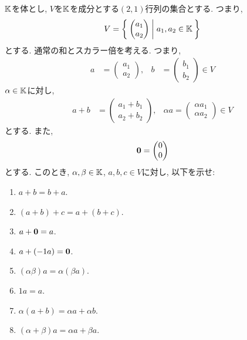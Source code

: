 \begin{quiz}
  $\mathbb{K}$を体とし, $V$を$\mathbb{K}$を成分とする$(2,1)$行列の集合とする.
  つまり,
  \begin{align*}
    V=\Set{\begin{pmatrix}a_1\\a_2\end{pmatrix}|a_1,a_2\in \mathbb{K}}
  \end{align*}
  とする. 通常の和とスカラー倍を考える.  つまり,
  \begin{align*}
    a&=\begin{pmatrix}a_1\\a_2\end{pmatrix}, & b&=\begin{pmatrix}b_1\\b_2\end{pmatrix} \in V
  \end{align*}
  $\alpha\in\mathbb{K}$に対し,
  \begin{align*}
    a+b&=\begin{pmatrix}a_1+b_1\\a_2+b_2\end{pmatrix}, & \alpha a=\begin{pmatrix}\alpha a_1\\\alpha a_2\end{pmatrix} \in V
  \end{align*}
  とする. また,
  \begin{align*}
  \boldsymbol{0}=
  \begin{pmatrix}
    0\\0
  \end{pmatrix}
  \end{align*}
  とする.
  このとき, $\alpha,\beta\in\mathbb{K}$, $a,b,c\in V$に対し, 以下を示せ:
  \begin{enumerate}
    \item $a+b=b+a$.
    \item $(a+b)+c=a+(b+c)$.
    \item $a+\boldsymbol{0}=a$.
    \item $a+(-1 a)=\boldsymbol{0}$.
    \item $(\alpha\beta)a=\alpha(\beta a)$.
    \item $1a=a$.
    \item $\alpha(a+b)=\alpha a+\alpha b$.
    \item $(\alpha+\beta)a=\alpha a+\beta a$.
  \end{enumerate}
\end{quiz}

